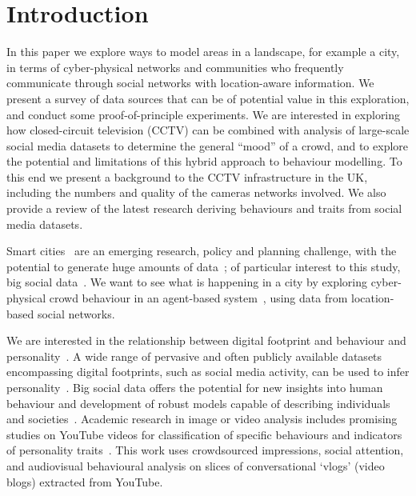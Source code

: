 \documentclass[conference]{IEEEtran}
\begin{document}
\section{Introduction}

In this paper we explore ways to model areas in a landscape, for
example a city, in terms of cyber-physical networks and communities
who frequently communicate through social networks with location-aware
information. We present a survey of data sources that can be of
potential value in this exploration, and conduct some
proof-of-principle experiments. We are interested in exploring how
closed-circuit television (CCTV) can be combined with analysis of
large-scale social media datasets to determine the general ``mood'' of
a crowd, and to explore the potential and limitations of this hybrid
approach to behaviour modelling. To this end we present a background
to the CCTV infrastructure in the UK, including the
numbers and quality of the cameras networks involved. We also provide
a review of the latest research deriving behaviours and traits from
social media datasets.

Smart cities~\cite{goscience:2014,cosgrave-et-al:2014} are an emerging
research, policy and planning challenge, with the potential to
generate huge amounts of data~\cite{arup-et-al:2011}; of particular
interest to this study, big social data~\cite{postsm:2014}. We want to
see what is happening in a city by exploring cyber-physical crowd
behaviour in an agent-based system~\cite{bonabeau:2002}, using data
from location-based social networks.

We are interested in the relationship between digital footprint and
behaviour and
personality~\cite{oatley+crick:2014,oatley-et-al:2006}. A wide range
of pervasive and often publicly available datasets encompassing
digital footprints, such as social media activity, can be used to
infer
personality~\cite{lambiotte+kosinski:2014,oatley-et-al-soccogcomp2015}. Big
social data offers the potential for new insights into human behaviour
and development of robust models capable of describing individuals and
societies~\cite{lazer-et-al:2009}. Academic research in image or video
analysis includes promising studies on YouTube videos for
classification of specific behaviours and indicators of personality
traits~\cite{biel+gatica-perez:2012}. This work uses crowdsourced
impressions, social attention, and audiovisual behavioural analysis on
slices of conversational `vlogs' (video blogs) extracted from YouTube.
\end{document}
